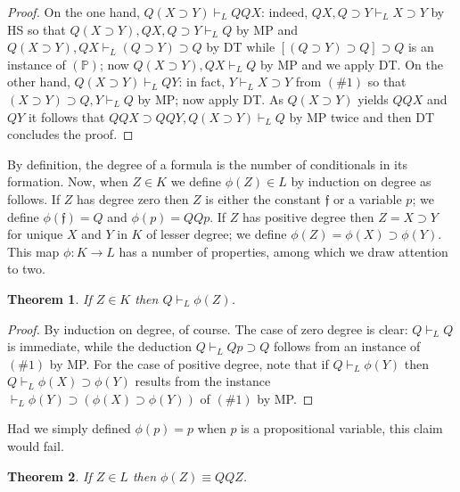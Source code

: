 \documentclass[10pt]{amsart}
\theoremstyle{plain}
\newtheorem{theorem}{Theorem}
\numberwithin{equation}{section}
\begin{document}
\begin{proof} 
On the one hand, $Q (X \supset Y) \vdash_L QQX$: indeed, $Q X, Q \supset Y \vdash_L X \supset Y$ by HS so that $Q (X \supset Y), Q X, Q \supset Y \vdash_L Q$ by MP and $Q (X \supset Y), Q X \vdash_L (Q \supset Y) \supset Q$ by DT while $[(Q \supset Y) \supset Q] \supset Q$ is an instance of $(\mathbb{P})$; now $Q (X \supset Y), Q X \vdash_L Q$ by MP and we apply DT. On the other hand, $Q (X \supset Y) \vdash_L Q Y$: in fact, $Y \vdash_L X \supset Y$ from $(\#1)$ so that $(X \supset Y) \supset Q, Y \vdash_L Q$ by MP; now apply DT. As $Q (X \supset Y)$ yields $QQ X$ and $Q Y$ it follows that $QQ X \supset QQY, Q (X \supset Y) \vdash_L Q$ by MP twice and then DT concludes the proof. 
\end{proof} 

\medbreak 

By definition, the degree of a formula is the number of conditionals in its formation. Now, when $Z \in K$ we define $\phi (Z) \in L$ by induction on degree as follows. If $Z$ has degree zero then $Z$ is either the constant $\mathfrak{f}$ or a variable $p$; we define $\phi(\mathfrak{f}) = Q$ and $\phi (p) = QQ p$. If $Z$ has positive degree then $Z = X \supset Y$ for unique $X$ and $Y$ in $K$ of lesser degree; we define $\phi (Z) = \phi (X) \supset \phi (Y)$. This map $\phi : K {\rightarrow} L$ has a number of properties, among which we draw attention to two. 

\medbreak

\begin{theorem} \label{phiK}
If $Z \in K$ then $Q \vdash_L \phi (Z)$. 
\end{theorem} 

\begin{proof} 
By induction on degree, of course. The case of zero degree is clear: $Q \vdash_L Q$ is immediate, while the deduction $Q \vdash_L Qp \supset Q$ follows from an instance of $(\# 1)$ by MP. For the case of positive degree, note that if $Q \vdash_L \phi (Y)$ then $Q \vdash_L \phi (X) \supset \phi (Y)$ results from the instance $\vdash_L \phi (Y) \supset (\phi (X) \supset \phi (Y))$ of $(\# 1)$ by MP. 
\end{proof} 

\medbreak 

Had we simply defined $\phi (p) = p$ when $p$ is a propositional variable, this claim would fail. 

\medbreak 

\begin{theorem} \label{phiL}
If $Z \in L$ then $\phi (Z) \equiv QQ Z$. 
\end{theorem} 
\end{document}
